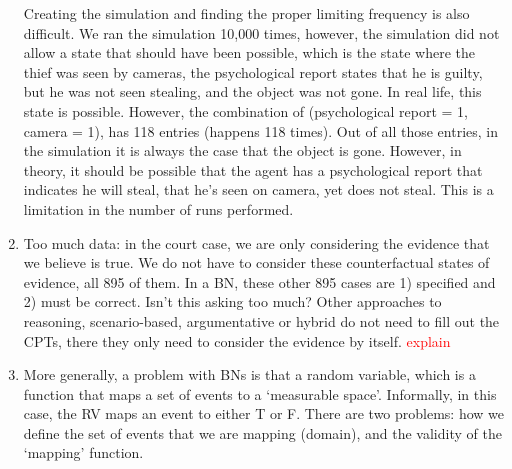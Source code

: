 \documentclass[12pt]{article}
\begin{document}
\begin{enumerate}
Creating the simulation and finding the proper limiting frequency is also difficult. We ran the simulation 10,000 times, however, the simulation did not allow a state that should have been possible, which is the state where the thief was seen by cameras, the psychological report states that he is guilty, but he was not seen stealing, and the object was not gone. In real life, this state is possible. However, the combination of (psychological report = 1, camera = 1), has 118 entries (happens 118 times). Out of all those entries, in the simulation it is always the case that the object is gone. However, in theory, it should be possible that the agent has a psychological report that indicates he will steal, that he's seen on camera, yet does not steal. This is a limitation in the number of runs performed.



\item Too much data: in the court case, we are only considering the evidence that we believe is true. We do not have to consider these counterfactual states of evidence, all 895 of them. In a BN, these other 895 cases are 1) specified and 2) must be correct. Isn't this asking too much? Other approaches to reasoning, scenario-based, argumentative or hybrid do not need to fill out the CPTs, there they only need to consider the evidence by itself.  \textcolor{red} {explain}



\item More generally, a problem with BNs is that a random variable, which is a function that maps a set of events to a `measurable space'. Informally, in this case, the RV maps an event to either T or F. There are two problems: how we define the set of events that we are mapping (domain), and the validity of the `mapping' function.


\end{enumerate}
\end{document}
